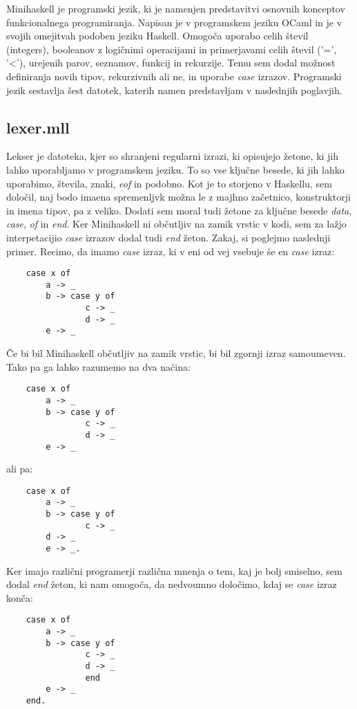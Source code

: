 \documentclass[a4paper]{report}
\begin{document}
Minihaskell je programski jezik, ki je namenjen predstavitvi osnovnih konceptov funkcionalnega programiranja. Napisan je v programskem jeziku 
OCaml in je v svojih omejitvah podoben jeziku Haskell. Omogoča uporabo celih števil (integers), booleanov z logičnimi operacijami in primerjavami 
celih števil ('=', '<'), urejenih parov, seznamov, funkcij in rekurzije. Temu sem dodal možnost definiranja novih tipov, rekurzivnih ali ne, in 
uporabe \emph{case} izrazov. Programski jezik sestavlja šest datotek, katerih namen predstavljam v naslednjih poglavjih.

\subsection{lexer.mll}
Lekser je datoteka, kjer so shranjeni regularni izrazi, ki opisujejo žetone, ki jih lahko uporabljamo v programskem jeziku. To so vse ključne 
besede, ki jih lahko uporabimo, števila, znaki, \emph{eof} in podobno. Kot je to storjeno v Haskellu, sem določil, naj bodo imaena spremenljvk 
možna le z majhno začetnico, konstruktorji in imena tipov, pa z veliko. Dodati sem moral tudi žetone za ključne besede \emph{data}, \emph{case}, 
\emph{of} in \emph{end}. Ker Minihaskell ni občutljiv na zamik vrstic v kodi, sem za lažjo interpetacijio \emph{case} izrazov dodal tudi \emph{end} 
žeton. Zakaj, si poglejmo naslednji primer. Recimo, da imamo \emph{case} izraz, ki v eni od vej vsebuje še en \emph{case} izraz:
\begin{lstlisting}
    case x of 
        a -> _
        b -> case y of
                c -> _
                d -> _
        e -> _
\end{lstlisting}
Če bi bil Minihaskell občutljiv na zamik vrstic, bi bil zgornji izraz samoumeven. Tako pa ga lahko razumemo na dva načina:
\begin{lstlisting}
    case x of 
        a -> _
        b -> case y of
                c -> _
                d -> _
        e -> _
\end{lstlisting}
ali pa:
\begin{lstlisting}
    case x of 
        a -> _
        b -> case y of
                c -> _
        d -> _
        e -> _.
\end{lstlisting}
Ker imajo različni programerji različna mnenja o tem, kaj je bolj smiselno, sem dodal \emph{end} žeton, ki nam omogoča, da nedvoumno določimo, 
kdaj se \emph{case} izraz konča:
\begin{lstlisting}
    case x of 
        a -> _
        b -> case y of
                c -> _
                d -> _
                end
        e -> _
    end.
\end{lstlisting}
\end{document}
